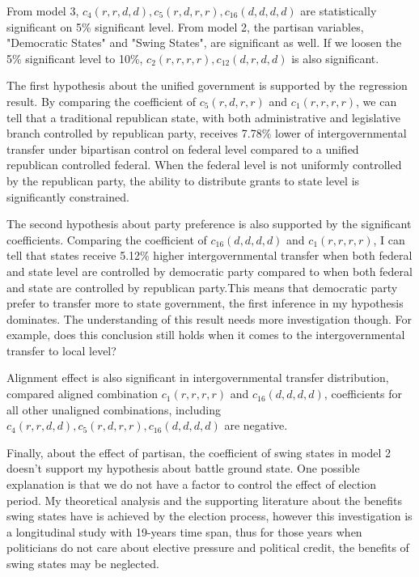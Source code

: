 From model 3, $ c_4(r, r, d, d), c_5(r, d, r, r), c_{16}(d, d, d, d)$ are statistically significant on 5\% significant level. From model 2, the partisan variables, "Democratic States" and "Swing States", are significant as well. If we loosen the 5\% significant level to 10\%, $c_2(r, r, r, r), c_{12}(d, r, d, d)$ is also significant.

The first hypothesis about the unified government is supported by the regression result. By comparing the coefficient of $c_5(r, d, r, r)$ and $c_1(r, r, r, r)$, we can tell that a traditional republican state, with both administrative and legislative branch controlled by republican party, receives 7.78\% lower of intergovernmental transfer under bipartisan control on federal level compared to a unified republican controlled federal. When the federal level is not uniformly controlled by the republican party, the ability to distribute grants to state level is significantly constrained.

The second hypothesis about party preference is also supported by the significant coefficients. Comparing the coefficient of $c_{16}(d, d, d, d)$ and $c_1(r, r, r, r)$, I can tell that states receive 5.12\% higher intergovernmental transfer when both federal and state level are controlled by democratic party compared to when both federal and state are controlled by republican party.This means that democratic party prefer to transfer more to state government, the first inference in my hypothesis dominates. The understanding of this result needs more investigation though. For example, does this conclusion still holds when it comes to the intergovernmental transfer to local level?

Alignment effect is also significant in intergovernmental transfer distribution, compared aligned combination $c_1(r, r, r, r)$ and $c_16(d, d, d, d)$, coefficients for all other unaligned combinations, including $c_4(r, r, d, d), c_5(r, d, r, r), c_{16}(d, d, d, d)$ are negative.

Finally, about the effect of partisan, the coefficient of swing states in model 2 doesn't support my hypothesis about battle ground state. One possible explanation is that we do not have a factor to control the effect of election period. My theoretical analysis and the supporting literature about the benefits swing states have is achieved by the election process, however this investigation is a longitudinal study with 19-years time span, thus for those years when politicians do not care about elective pressure and political credit, the benefits of swing states may be neglected.

